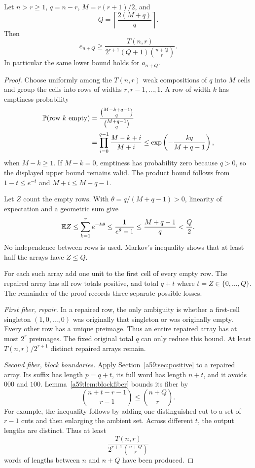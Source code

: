 \documentclass[11pt,letterpaper]{article}
\theoremstyle{remark}\newtheorem{remark}[theorem]{Remark}
\theoremstyle{remark}\newtheorem{wremark}{Remark}\renewcommand{\thewremark}{W\arabic{wremark}}
\theoremstyle{plain}\newtheorem{wcorollary}[wremark]{Corollary}
\begin{document}
\begin{proposition}\label{a59:prop:repair}
Let $n>r\ge1$, $q=n-r$, $M=r(r+1)/2$, and
\begin{equation}\label{a59:eq:Q}
 Q=\left\lceil\frac{2(M+q)}q\right\rceil.
\end{equation}
Then
\begin{equation}\label{a59:eq:finitelower}
 e_{n+Q}\ge
 \frac{T(n,r)}{2^{r+1}(Q+1)\binom{n+Q}{r}}.
\end{equation}
In particular the same lower bound holds for $a_{n+Q}$.
\end{proposition}
\begin{proof}
Choose uniformly among the $T(n,r)$ weak compositions of $q$ into $M$ cells and group the cells into rows of widths $r,r-1,\ldots,1$. A row of width $k$ has emptiness probability
\begin{align}
 \mathbb P(\text{row }k\text{ empty})
 &=\frac{\binom{M-k+q-1}{q}}{\binom{M+q-1}{q}}\notag\\
 &=\prod_{i=0}^{q-1}\frac{M-k+i}{M+i}
 \le\exp\left(-\frac{kq}{M+q-1}\right),\label{a59:eq:empty}
\end{align}
when $M-k\ge1$. If $M-k=0$, emptiness has probability zero because $q>0$, so the displayed upper bound remains valid. The product bound follows from $1-t\le e^{-t}$ and $M+i\le M+q-1$.

Let $Z$ count the empty rows. With $\theta=q/(M+q-1)>0$, linearity of expectation and a geometric sum give
\begin{equation}\label{a59:eq:expect}
 \mathbb E Z\le\sum_{k=1}^r e^{-k\theta}
 \le\frac1{e^\theta-1}\le\frac{M+q-1}{q}<\frac Q2.
\end{equation}
No independence between rows is used. Markov's inequality shows that at least half the arrays have $Z\le Q$.

For each such array add one unit to the first cell of every empty row. The repaired array has all row totals positive, and total $q+t$ where $t=Z\in\{0,\ldots,Q\}$. The remainder of the proof records three separate possible losses.

\emph{First fiber, repair.} In a repaired row, the only ambiguity is whether a first-cell singleton $(1,0,\ldots,0)$ was originally that singleton or was originally empty. Every other row has a unique preimage. Thus an entire repaired array has at most $2^r$ preimages. The fixed original total $q$ can only reduce this bound. At least $T(n,r)/2^{r+1}$ distinct repaired arrays remain.

\emph{Second fiber, block boundaries.} Apply Section~\ref{a59:sec:positive} to a repaired array. Its suffix has length $p=q+t$, its full word has length $n+t$, and it avoids $000$ and $100$. Lemma~\ref{a59:lem:blockfiber} bounds its fiber by
\[
 \binom{n+t-r-1}{r-1}\le\binom{n+Q}{r}.
\]
For example, the inequality follows by adding one distinguished cut to a set of $r-1$ cuts and then enlarging the ambient set. Across different $t$, the output lengths are distinct. Thus at least
\[
 \frac{T(n,r)}{2^{r+1}\binom{n+Q}{r}}
\]
words of lengths between $n$ and $n+Q$ have been produced.


\end{proof}
\end{document}
